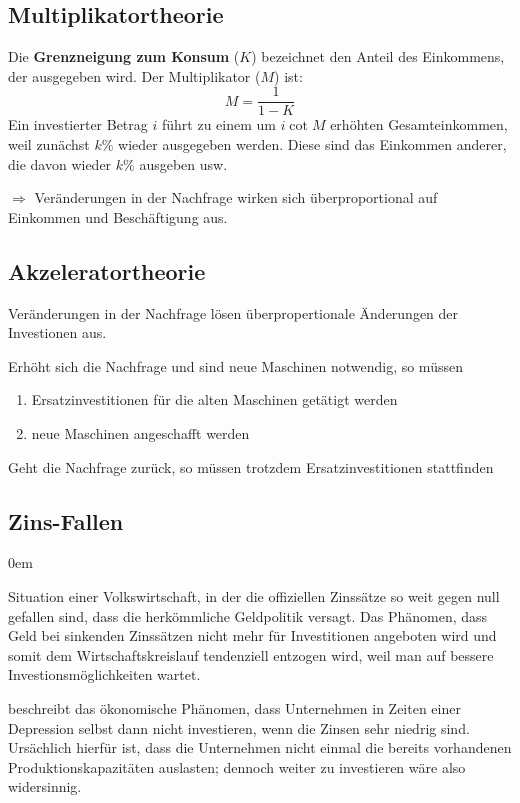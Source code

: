 \subsection{Multiplikatortheorie}
Die \textbf{Grenzneigung zum Konsum} ($K$) bezeichnet den Anteil des Einkommens, der ausgegeben wird.
Der Multiplikator ($M$) ist:
\begin{equation*}
	M = \frac{1}{1 - K}
\end{equation*}
Ein investierter Betrag $i$ führt zu einem um $i \cot M$ erhöhten Gesamteinkommen,
weil zunächst $k\%$ wieder ausgegeben werden. Diese sind das Einkommen anderer, die davon wieder $k\%$ ausgeben usw.

$\Rightarrow$ Veränderungen in der Nachfrage wirken sich überproportional auf Einkommen und Beschäftigung aus.

\subsection{Akzeleratortheorie}
Veränderungen in der Nachfrage lösen überpropertionale Änderungen der Investionen aus.

Erhöht sich die Nachfrage und sind neue Maschinen notwendig, so müssen 
\begin{enumerate}\itemsep0em
	\item Ersatzinvestitionen für die alten Maschinen getätigt werden
	\item neue Maschinen angeschafft werden
\end{enumerate}
Geht die Nachfrage zurück, so müssen trotzdem Ersatzinvestitionen stattfinden

\subsection{Zins-Fallen}
\begin{description}\itemsep0em
	\item [Liquiditätsfalle] 
	Situation einer Volkswirtschaft, in der die offiziellen Zinssätze so weit gegen null gefallen sind, dass die herkömmliche Geldpolitik versagt. Das Phänomen, dass Geld bei sinkenden Zinssätzen nicht mehr für Investitionen angeboten wird und somit dem Wirtschaftskreislauf tendenziell entzogen wird, weil man auf bessere Investionsmöglichkeiten wartet.

	\item [Investitionsfalle] beschreibt das ökonomische Phänomen, dass Unternehmen in Zeiten einer Depression selbst dann nicht investieren, wenn die Zinsen sehr niedrig sind. Ursächlich hierfür ist, dass die Unternehmen nicht einmal die bereits vorhandenen Produktionskapazitäten auslasten; dennoch weiter zu investieren wäre also widersinnig.
	
\end{description}
